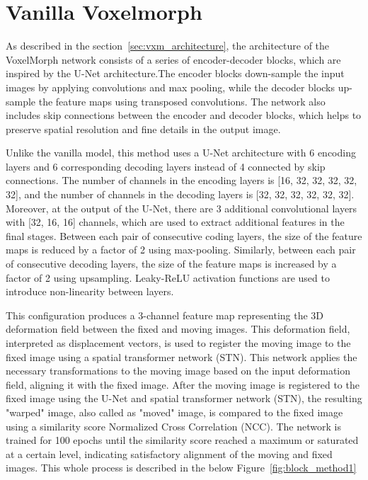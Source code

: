 \documentclass{book}
\begin{document}
	\section{Vanilla Voxelmorph}\label{sec:method1}
	
	As described in the section~\ref{sec:vxm_architecture}, the architecture of the VoxelMorph network consists of a series of encoder-decoder blocks, which are inspired by the U-Net architecture.The encoder blocks down-sample the input images by applying convolutions and max pooling, while the decoder blocks up-sample the feature maps using transposed convolutions. The network also includes skip connections between the encoder and decoder blocks, which helps to preserve spatial resolution and fine details in the output image.
	
	Unlike the vanilla model, this method uses a U-Net architecture with 6 encoding layers and 6 corresponding decoding layers instead of 4 connected by skip connections. The number of channels in the encoding layers is [16, 32, 32, 32, 32, 32], and the number of channels in the decoding layers is [32, 32, 32, 32, 32, 32]. Moreover, at the output of the U-Net, there are 3 additional convolutional layers with [32, 16, 16] channels, which are used to extract additional features in the final stages. Between each pair of consecutive coding layers, the size of the feature maps is reduced by a factor of 2 using max-pooling. Similarly, between each pair of consecutive decoding layers, the size of the feature maps is increased by a factor of 2 using upsampling. Leaky-ReLU activation functions are used to introduce non-linearity between layers.
	
	This configuration produces a 3-channel feature map representing the 3D deformation field between the fixed and moving images. This deformation field, interpreted as displacement vectors, is used to register the moving image to the fixed image using a spatial transformer network (STN). This network applies the necessary transformations to the moving image based on the input deformation field, aligning it with the fixed image. After the moving image is registered to the fixed image using the U-Net and spatial transformer network (STN), the resulting "warped" image, also called as "moved" image, is compared to the fixed image using a similarity score Normalized Cross Correlation (NCC). The network is trained for 100 epochs until the similarity score reached a maximum or saturated at a certain level, indicating satisfactory alignment of the moving and fixed images. This whole process is described in the below Figure~\ref{fig:block_method1}
	
\end{document}
